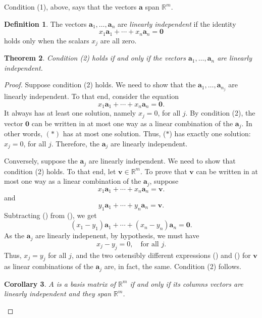 \documentclass[12pt]{amsart}
\newcommand{\RR}{\mathbb{R}}
\newtheorem{theorem}{Theorem}[section]
\newtheorem{corollary}[theorem]{Corollary}
\theoremstyle{definition}
\newtheorem{definition}[theorem]{Definition}
\newcommand{\ba}{\mathbf{a}}
\newcommand{\bv}{\mathbf{v}}
\newcommand{\bzero}{\mathbf{0}}
\newcommand{\bas}{\ba_1,\ldots,\ba_n}
\begin{document}
Condition (1), above, says that the vectors $\ba$ span $\RR^m$.

\begin{definition}
	The vectors $\bas$ are \emph{linearly independent} if the identity
	\[
		x_1\ba_1 + \cdots + x_n\ba_n = \bzero
	\]
	holds only when the scalars $x_j$ are all zero.
\end{definition}

\begin{theorem}
	Condition (2) holds if and only if the vectors $\bas$ are linearly independent.
\end{theorem}

\begin{proof}
	Suppose condition (2) holds.
	We need to show that the $\bas_j$ are linearly independent.
	To that end, consider the equation
	\begin{equation*}
		x_1\ba_1+\cdots + x_n\ba_n=\bzero.\tag{$*$}
	\end{equation*}
        It always has at least one solution, namely $x_j=0$, for all $j$.
	By condition (2), the vector $\bzero$ can be written in at most one way as a linear
	combination of the $\ba_j$. In other words, $(*)$ has at most one solution. 
	Thus, ($*$) has exactly one solution: $x_j=0$, for all $j$.
	Therefore, the $\ba_j$ are linearly independent.

	Conversely, suppose the $\ba_j$ are linearly independent.
	We need to show that condition (2) holds. 
	To that end, let $\bv\in\RR^m$.
	To prove that $\bv$ can be written in at most one way as a linear combination of the $\ba_j$,
	suppose
	\begin{equation*}
		x_1\ba_1+\cdots + x_n\ba_n=\bv.\tag{$\dag$}
	\end{equation*}
	and
	\begin{equation*}
		y_1\ba_1+\cdots + y_n\ba_n=\bv.\tag{$\ddag$}
	\end{equation*}
	Subtracting (\ddag) from (\dag), we get
	\begin{equation*}
		(x_1-y_1)\ba_1+\cdots + (x_n-y_n)\ba_n=\bzero.
	\end{equation*}
	As the $\ba_j$ are linearly indepenent, by hypothesis, we must have 
	\[
		x_j-y_j=0,\quad\text{for all $j$}.
	\]
	Thus, $x_j=y_j$ for all $j$, and the two ostensibly different expressions (\dag) and (\ddag)
	for $\bv$ as linear combinations of the $\ba_j$ are, in fact, the same.
	Condition (2) follows.

	\begin{corollary}
	$A$ is a basis matrix of $\RR^m$ if and only if its columns vectors are linearly independent and they span $\RR^m$.
	\end{corollary}
\end{proof}
\end{document}
